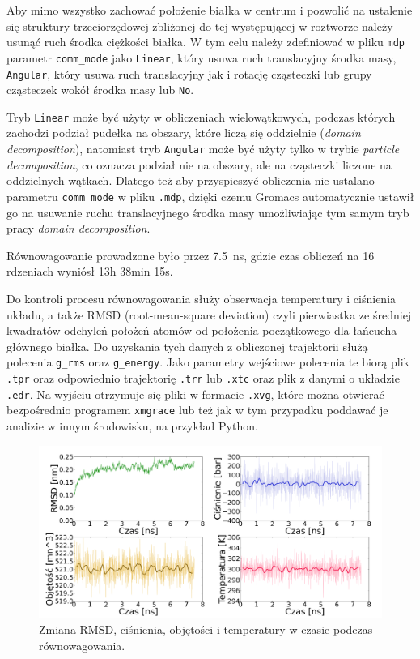 Aby mimo wszystko zachować położenie białka w centrum i pozwolić na ustalenie się struktury trzeciorzędowej zbliżonej do tej występującej w roztworze należy usunąć ruch środka ciężkości białka. W tym celu należy zdefiniować w pliku \texttt{mdp} parametr \texttt{comm\_mode} jako \texttt{Linear}, który usuwa ruch translacyjny środka masy, \texttt{Angular}, który usuwa ruch translacyjny jak i rotację cząsteczki lub grupy cząsteczek wokół środka masy lub \texttt{No}.

Tryb \texttt{Linear} może być użyty w obliczeniach wielowątkowych, podczas których zachodzi podział pudełka na obszary, które liczą się oddzielnie (\textit{domain decomposition}), natomiast tryb \texttt{Angular} może być użyty tylko w trybie \textit{particle decomposition}, co oznacza podział nie na obszary, ale na cząsteczki liczone na oddzielnych wątkach. Dlatego też aby przyspieszyć obliczenia nie ustalano parametru \texttt{comm\_mode} w pliku \texttt{.mdp}, dzięki czemu Gromacs automatycznie ustawił go na usuwanie ruchu translacyjnego środka masy umożliwiając tym samym tryb pracy \textit{domain decomposition}.

Równowagowanie prowadzone było przez 7.5~ns, gdzie czas obliczeń na 16 rdzeniach wyniósł 13h 38min 15s.

Do kontroli procesu równowagowania służy obserwacja temperatury i ciśnienia układu, a także RMSD (root-mean-square deviation) czyli pierwiastka ze średniej kwadratów odchyleń położeń atomów od położenia początkowego dla łańcucha głównego białka. Do uzyskania tych danych z obliczonej trajektorii służą polecenia \texttt{g\_rms} oraz \texttt{g\_energy}. Jako parametry wejściowe polecenia te biorą plik \texttt{.tpr} oraz odpowiednio trajektorię \texttt{.trr} lub \texttt{.xtc} oraz plik z danymi o układzie \texttt{.edr}. Na wyjściu otrzymuje się pliki w formacie \texttt{.xvg}, które można otwierać bezpośrednio programem \texttt{xmgrace} lub też jak w tym przypadku poddawać je analizie w innym środowisku, na przykład Python.


\begin{figure}[h]
\begin{centering}
\includegraphics[width=150mm]{./rys/rmsd.png}
\caption{Zmiana RMSD, ciśnienia, objętości i temperatury w czasie podczas równowagowania.}
\end{centering}
\end{figure}


